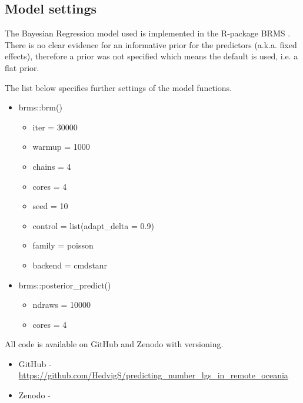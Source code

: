 \documentclass[unnumsec,webpdf,modern,medium]{oup-authoring-template}
\begin{document}
\subsection{Model settings}
\label{appendix_model_settings}
The Bayesian Regression model used is implemented in the R-package BRMS \citep{burkner2017brms}. There is no clear evidence for an informative prior for the predictors (a.k.a. fixed effects), therefore a prior was not specified which means the default is used, i.e. a flat prior.

The list below specifies further settings of the model functions.

\begin{itemize}
    \item brms::brm()
    \begin{itemize}
    \item  iter = 30000
    \item  warmup = 1000
    \item  chains = 4
    \item  cores = 4
    \item  seed = 10
    \item  control = list(adapt\_delta = 0.9)
    \item family = poisson
    \item backend = cmdstanr
    \end{itemize}
    \item brms::posterior\_predict()
    \begin{itemize}
    \item  ndraws = 10000
    \item  cores = 4
    \end{itemize}
\end{itemize}

All code is available on GitHub and Zenodo with versioning.

\begin{itemize}
    \item GitHub - \url{https://github.com/HedvigS/predicting_number_lgs_in_remote_oceania}
    \item Zenodo - 
\end{itemize}




\end{document}
